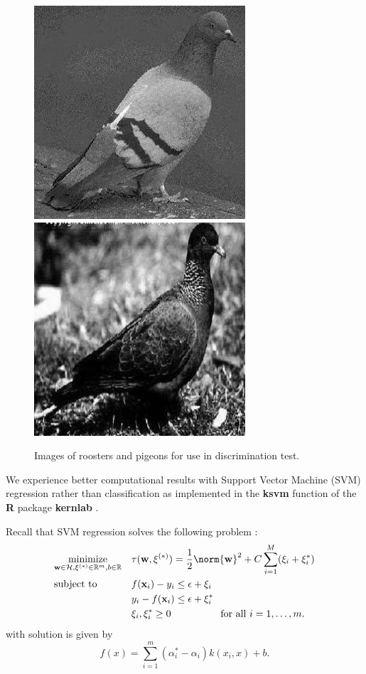 \begin{figure}
      \includegraphics[scale=.2]{pigeonrs-image_0002.jpg} 
      \includegraphics[scale=.2]{pigeonrs-image_0004.jpg} 
      \caption{Images of roosters and pigeons for use in
        discrimination test.}
  \label{fig:birds}
\end{figure}

We experience better computational results with Support Vector
Machine (SVM) regression rather than classification 
as implemented in the {\bf ksvm} function of the {\bf R}
\cite{cran} package {\bf kernlab} \cite{kernlab}.

Recall that SVM regression solves the following problem \cite{scholkopf2002learning}:
\begin{equation*}
\begin{aligned}
& \underset{\mathbf{w}\in\mathcal{H},\mathbf{\xi}^{(*)}\in\mathbb{R}^m,b\in\mathbb{R}}{\text{minimize}}
& &\tau(\mathbf{w},\mathbf{\xi}^{(*)})=\frac{1}{2}\norm{\mathbf{w}}^2+C\sum_{i=1}^M(\xi_i+\xi_i^*) \\
& \text{subject to}
& & f(\mathbf{x}_i)-y_i \leq \epsilon +\xi_i\\
&&& y_i-f(\mathbf{x}_i) \leq \epsilon+\xi_i^* \\
&&& \xi_i,\xi_i^*\geq0 \qquad \qquad \quad \text{for all } i=1,\ldots,m.
\end{aligned}
\end{equation*}
with solution is given by
\begin{equation*}
  f(x)=\sum_{i=1}^m(\alpha_i^*-\alpha_i)k(x_i,x)+b.
\end{equation*}
